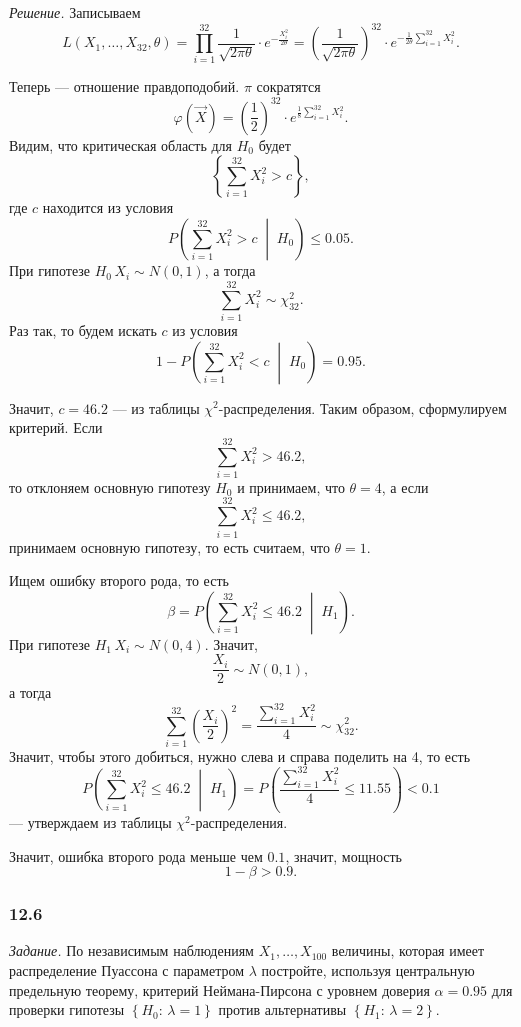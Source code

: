 \textit{Решение.} Записываем
$$L \left( X_1, \dotsc, X_{32}, \theta \right) =
  \prod \limits_{i = 1}^{32} \frac{1}{ \sqrt{2 \pi \theta }} \cdot e^{- \frac{X_i^2}{2 \theta }} =
  \left( \frac{1}{ \sqrt{2 \pi \theta }} \right)^{32} \cdot
  e^{- \frac{1}{2 \theta} \sum \limits_{i = 1}^{32} X_i^2}.$$

Теперь --- отношение правдоподобий.
$ \pi $ сократятся
$$ \varphi \left( \vec{X} \right) =
   \left( \frac{1}{2} \right)^{32} \cdot e^{\frac{1}{8} \sum \limits_{i = 1}^{32} X_i^2}.$$
Видим, что критическая область для $H_0$ будет
$$ \left\{ \sum \limits_{i = 1}^{32} X_i^2 > c \right\},$$
где $c$ находится из условия
$$P \left( \sum \limits_{i = 1}^{32} X_i^2 > c \; \middle| \; H_0 \right) \leq
  0.05.$$
При гипотезе $H_0 \, X_i \sim N \left( 0, 1 \right) $, а тогда
$$ \sum \limits_{i = 1}^{32} X_i^2 \sim
  \chi_{32}^2.$$
Раз так, то будем искать $c$ из условия
$$1 - P \left( \sum \limits_{i = 1}^{32} X_i^2 < c \; \middle| \; H_0 \right) =
  0.95.$$

Значит, $c = 46.2$ --- из таблицы $ \chi^2$-распределения.
Таким образом, сформулируем критерий.
Если
$$ \sum \limits_{i = 1}^{32} X_i^2 >
  46.2,$$
то отклоняем основную гипотезу $H_0$ и принимаем, что $ \theta = 4$, а если
$$ \sum \limits_{i = 1}^{32} X_i^2 \leq
  46.2,$$
принимаем основную гипотезу, то есть считаем, что $ \theta = 1$.

Ищем ошибку второго рода, то есть
$$ \beta =
  P \left( \sum \limits_{i = 1}^{32} X_i^2 \leq 46.2 \; \middle| \; H_1 \right).$$
При гипотезе $H_1 \, X_i \sim N \left( 0, 4 \right) $.
Значит,
$$ \frac{X_i}{2} \sim
  N \left( 0, 1 \right),$$
а тогда
$$ \sum \limits_{i = 1}^{32} \left( \frac{X_i}{2} \right)^2 =
  \frac{ \sum \limits_{i = 1}^{32} X_i^2}{4} \sim
  \chi_{32}^2.$$
Значит, чтобы этого добиться, нужно слева и справа поделить на 4, то есть
$$P \left( \sum \limits_{i = 1}^{32} X_i^2 \leq 46.2 \; \middle| \; H_1 \right) =
  P \left( \frac{ \sum \limits_{i = 1}^{32} X_i^2}{4} \leq 11.55 \right) <
  0.1$$
--- утверждаем из таблицы $ \chi^2$-распределения.

Значит, ошибка второго рода меньше чем $0.1$, значит, мощность
$$1 - \beta >
  0.9.$$

\subsubsection*{12.6}

\textit{Задание.}
По независимым наблюдениям $X_1, \dotsc, X_{100}$ величины,
которая имеет распределение Пуассона с параметром $ \lambda $ постройте,
используя центральную предельную теорему,
критерий Неймана-Пирсона с уровнем доверия $ \alpha = 0.95$ для проверки гипотезы
$ \left\{ H_0: \, \lambda = 1 \right\} $ против альтернативы
$ \left\{ H_1: \, \lambda = 2 \right\} $.

